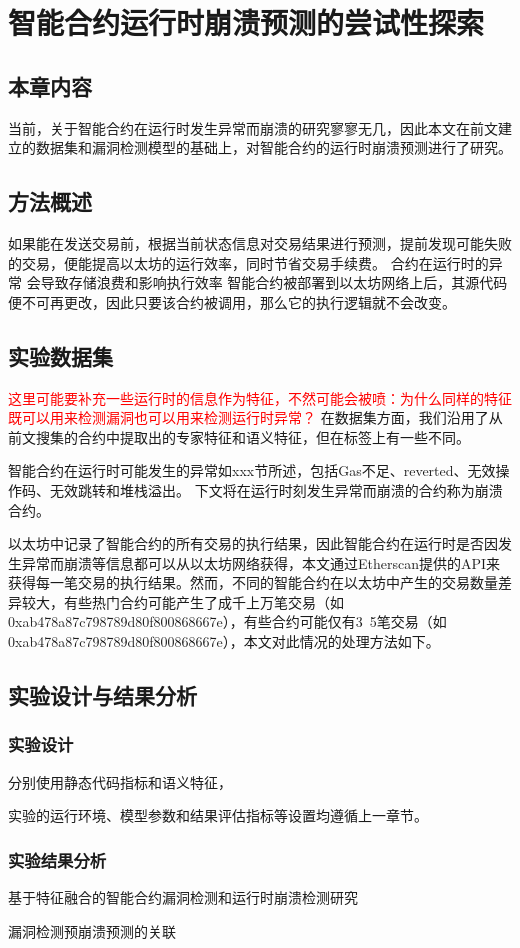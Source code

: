 \chapter{智能合约运行时崩溃预测的尝试性探索}
\section{本章内容}
当前，关于智能合约在运行时发生异常而崩溃的研究寥寥无几，因此本文在前文建立的数据集和漏洞检测模型的基础上，对智能合约的运行时崩溃预测进行了研究。
\section{方法概述}
如果能在发送交易前，根据当前状态信息对交易结果进行预测，提前发现可能失败的交易，便能提高以太坊的运行效率，同时节省交易手续费。
合约在运行时的异常
会导致存储浪费和影响执行效率
智能合约被部署到以太坊网络上后，其源代码便不可再更改，因此只要该合约被调用，那么它的执行逻辑就不会改变。
\section{实验数据集}
\textcolor{red}{这里可能要补充一些运行时的信息作为特征，不然可能会被喷：为什么同样的特征既可以用来检测漏洞也可以用来检测运行时异常？}
在数据集方面，我们沿用了从前文搜集的合约中提取出的专家特征和语义特征，但在标签上有一些不同。

智能合约在运行时可能发生的异常如xxx节所述，包括Gas不足、reverted、无效操作码、无效跳转和堆栈溢出。
下文将在运行时刻发生异常而崩溃的合约称为崩溃合约。

以太坊中记录了智能合约的所有交易的执行结果，因此智能合约在运行时是否因发生异常而崩溃等信息都可以从以太坊网络获得，本文通过Etherscan提供的API来获得每一笔交易的执行结果。然而，不同的智能合约在以太坊中产生的交易数量差异较大，有些热门合约可能产生了成千上万笔交易（如0xab478a87c798789d80f800868667e），有些合约可能仅有3~5笔交易（如0xab478a87c798789d80f800868667e），本文对此情况的处理方法如下。
\section{实验设计与结果分析}

\subsection{实验设计}
分别使用静态代码指标和语义特征，

实验的运行环境、模型参数和结果评估指标等设置均遵循上一章节。
\subsection{实验结果分析}
基于特征融合的智能合约漏洞检测和运行时崩溃检测研究

漏洞检测预崩溃预测的关联